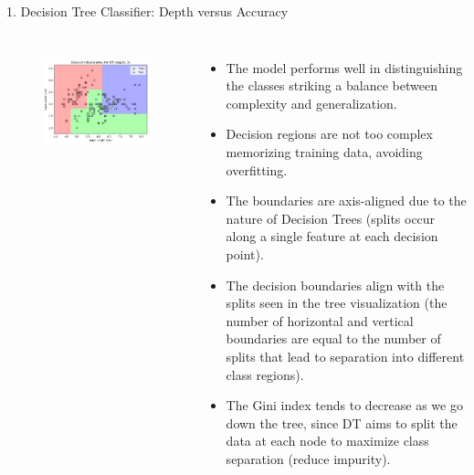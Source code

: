 \documentclass[aspectratio=169,xcolor=dvipsnames]{beamer}
\begin{document}
\begin{frame}{1. Decision Tree Classifier: Depth versus Accuracy}

    \begin{columns}[c] %

        \begin{figure}
            \centering
            \includegraphics[width=1.15\linewidth]{out/plot8_DT_decision_boundaries.png}
            \label{fig:1}
        \end{figure}
        

        \begin{itemize}
            \scriptsize
            \item The model performs well in distinguishing the classes striking a balance between complexity and generalization.
            \item Decision regions are not too complex memorizing training data, avoiding overfitting.
            \item The boundaries are axis-aligned due to the nature of Decision Trees 
            (splits occur along a single feature at each decision point).
            \item The decision boundaries align with the splits seen in the tree visualization 
            (the number of horizontal and vertical boundaries are equal to the number of splits that lead to 
            separation into different class regions).
            \item The Gini index tends to decrease as we go down the tree, since DT aims to split the data at each 
            node to maximize class separation (reduce impurity).
        \end{itemize}


    \end{columns}

\end{frame}
\end{document}
